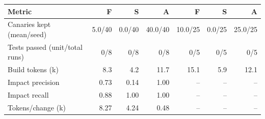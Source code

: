 \begin{tabular}{@{}lrrrrrr@{}}
\toprule
Metric & F & S & A & F & S & A \\
\midrule
Canaries kept (mean/seed) & 5.0/40 & 0.0/40 & 40.0/40 & 10.0/25 & 0.0/25 & 25.0/25 \\
Tests passed (unit/total runs) & 0/8 & 0/8 & 0/8 & 0/5 & 0/5 & 0/5 \\
Build tokens (k) & 8.3 & 4.2 & 11.7 & 15.1 & 5.9 & 12.1 \\
Impact precision & 0.73 & 0.14 & 1.00 & -- & -- & -- \\
Impact recall & 0.88 & 1.00 & 1.00 & -- & -- & -- \\
Tokens/change (k) & 8.27 & 4.24 & 0.48 & -- & -- & -- \\
\bottomrule
\end{tabular}
